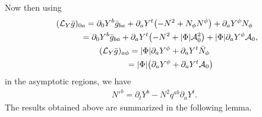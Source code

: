 \documentclass[11pt]{article}
\numberwithin{equation}{section}
\def\ptl{\partial}%
\numberwithin{equation}{section}
\begin{document}
 Now then using
 \begin{gather*}
 	(\mathcal{L}_Y \bar{g})_{0a} =\ptl_0 Y^b \bar{g}_{ba} + \ptl_a Y^t \bigl(-N^2 + N_\phi N^\phi\bigr) + \ptl_a Y^\phi N_\phi \notag\\
 	\hphantom{(\mathcal{L}_Y \bar{g})_{0a} }{}
 = \ptl_0 Y^b \bar{g}_{ba} + \ptl_a Y^t \bigl(- N^2 + \vert \Phi\vert\mathcal{A}^2_0\bigr) + \vert \Phi \vert \ptl_a Y^\phi \mathcal{A}_0,
\\
 	(\mathcal{L}_{Y} \bar{g})_{a \phi} = \vert \Phi \vert \ptl_a Y^\phi + \ptl_a Y^t \bar{N}_\phi \notag\\
 	\hphantom{(\mathcal{L}_{Y} \bar{g})_{a \phi}}{}
 = \vert \Phi\vert \bigl(\ptl_a Y^\phi + \ptl_a Y^t \mathcal{A}_0\bigr)
 	\end{gather*}
 in the asymptotic regions, we have
 \begin{align} \label{pert-shift}
 	N'^b = \ptl_t Y^b - N^2 q^{ab} \ptl_a Y^t.
 \end{align}
The results obtained above are summarized in the following lemma.
\end{document}
